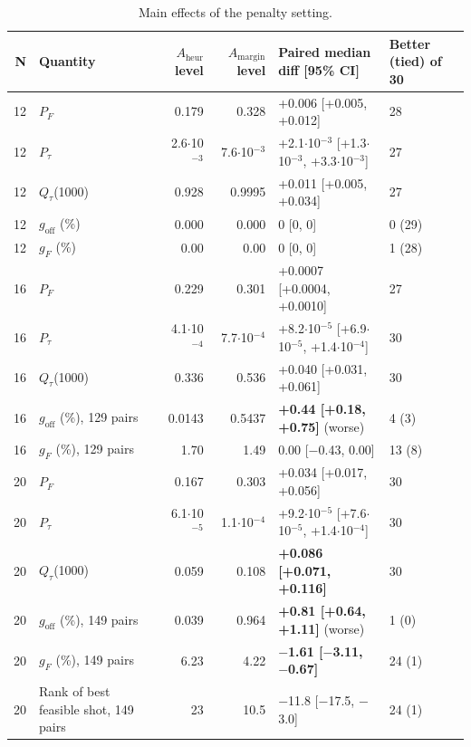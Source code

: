 \documentclass[journal]{IEEEtran}
\begin{document}
\begin{table}[!t]
\centering
\scriptsize
\caption{Main effects of the penalty setting.}
\label{tab:IV}
\begin{tabular}{rp{}rrp{}p{}}
\toprule
N & Quantity & $A_{\mathrm{heur}}$ level & $A_{\mathrm{margin}}$ level & Paired median diff [95\% CI] & Better (tied) of 30 \\
\midrule
12 & $P_{F}$ & 0.179 & 0.328 & +0.006 [+0.005, +0.012] & 28 \\
12 & $P_{\tau}$ & 2.6$\cdot$10$^{-3}$ & 7.6$\cdot$10$^{-3}$ & +2.1$\cdot$10$^{-3}$ [+1.3$\cdot$10$^{-3}$, +3.3$\cdot$10$^{-3}$] & 27 \\
12 & $Q_{\tau}$(1000) & 0.928 & 0.9995 & +0.011 [+0.005, +0.034] & 27 \\
12 & $g_{\mathrm{off}}$ (\%) & 0.000 & 0.000 & 0 [0, 0] & 0 (29) \\
12 & $g_{F}$ (\%) & 0.00 & 0.00 & 0 [0, 0] & 1 (28) \\
16 & $P_{F}$ & 0.229 & 0.301 & +0.0007 [+0.0004, +0.0010] & 27 \\
16 & $P_{\tau}$ & 4.1$\cdot$10$^{-4}$ & 7.7$\cdot$10$^{-4}$ & +8.2$\cdot$10$^{-5}$ [+6.9$\cdot$10$^{-5}$, +1.4$\cdot$10$^{-4}$] & 30 \\
16 & $Q_{\tau}$(1000) & 0.336 & 0.536 & +0.040 [+0.031, +0.061] & 30 \\
16 & $g_{\mathrm{off}}$ (\%), 129 pairs & 0.0143 & 0.5437 & \textbf{+0.44 [+0.18, +0.75]} (worse) & 4 (3) \\
16 & $g_{F}$ (\%), 129 pairs & 1.70 & 1.49 & 0.00 [$-$0.43, 0.00] & 13 (8) \\
20 & $P_{F}$ & 0.167 & 0.303 & +0.034 [+0.017, +0.056] & 30 \\
20 & $P_{\tau}$ & 6.1$\cdot$10$^{-5}$ & 1.1$\cdot$10$^{-4}$ & +9.2$\cdot$10$^{-5}$ [+7.6$\cdot$10$^{-5}$, +1.4$\cdot$10$^{-4}$] & 30 \\
20 & $Q_{\tau}$(1000) & 0.059 & 0.108 & \textbf{+0.086 [+0.071, +0.116]} & 30 \\
20 & $g_{\mathrm{off}}$ (\%), 149 pairs & 0.039 & 0.964 & \textbf{+0.81 [+0.64, +1.11]} (worse) & 1 (0) \\
20 & $g_{F}$ (\%), 149 pairs & 6.23 & 4.22 & \textbf{$-$1.61 [$-$3.11, $-$0.67]} & 24 (1) \\
20 & Rank of best feasible shot, 149 pairs & 23 & 10.5 & $-$11.8 [$-$17.5, $-$3.0] & 24 (1) \\
\bottomrule
\end{tabular}
\end{table}
\end{document}
